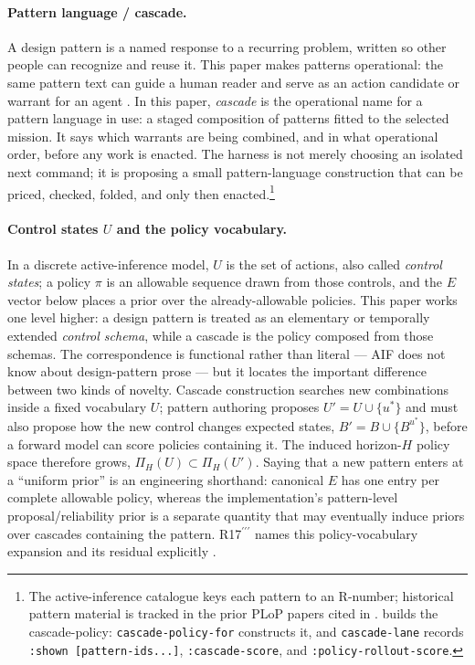 \paragraph{Pattern language / cascade.} A design pattern is a named response to a recurring problem, written so other people can recognize and reuse it.  This paper makes patterns operational: the same pattern text can guide a human reader and serve as an action candidate or warrant for an agent \cite{alexander1977a,alexander1999a,gamma1994a,corneli2015patterns,corneli2021patterns,corneli2022patterns,corneli2026patternsnewgenerationai}.  In this paper, \emph{cascade} is the operational name for a pattern language in use: a staged composition of patterns fitted to the selected mission.  It says which warrants are being combined, and in what operational order, before any work is enacted.  The harness is not merely choosing an isolated next command; it is proposing a small pattern-language construction that can be priced, checked, folded, and only then enacted.\footnote{The active-inference catalogue keys each pattern to an R-number; historical pattern material is tracked in the prior PLoP papers cited in .  builds the cascade-policy: \texttt{cascade-policy-for} constructs it, and \texttt{cascade-lane} records \texttt{:shown [pattern-ids...]}, \texttt{:cascade-score}, and \texttt{:policy-rollout-score}.}

\paragraph{Control states $U$ and the policy vocabulary.} In a discrete active-inference model, $U$ is the set of actions, also called \emph{control states}; a policy $\pi$ is an allowable sequence drawn from those controls, and the $E$ vector below places a prior over the already-allowable policies.  This paper works one level higher: a design pattern is treated as an elementary or temporally extended \emph{control schema}, while a cascade is the policy composed from those schemas.  The correspondence is functional rather than literal --- AIF does not know about design-pattern prose --- but it locates the important difference between two kinds of novelty. Cascade construction searches new combinations inside a fixed vocabulary $U$; pattern authoring proposes $U' = U \cup \{u^*\}$ and must also propose how the new control changes expected states, $B' = B \cup \{B^{u^*}\}$, before a forward model can score policies containing it.  The induced horizon-$H$ policy space therefore grows, $\Pi_H(U) \subset \Pi_H(U')$.  Saying that a new pattern enters at a ``uniform prior'' is an engineering shorthand: canonical $E$ has one entry per complete allowable policy, whereas the implementation's pattern-level proposal/reliability prior is a separate quantity that may eventually induce priors over cascades containing the pattern.  R17$^{\prime\prime\prime}$ names this policy-vocabulary expansion and its residual explicitly \cite{friston2019freeenergyprincipleparticular,smith2020structure}.

